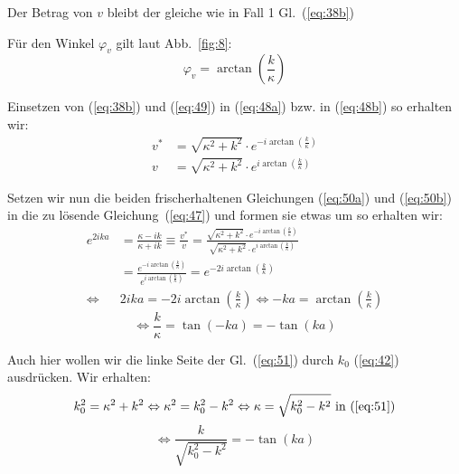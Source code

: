 Der Betrag von $v$ bleibt der gleiche wie in Fall 1 Gl.~(\ref{eq:38b})

Für den Winkel $\varphi_v$ gilt laut Abb.~\ref{fig:8}:
\begin{equation}
  \label{eq:49}
  \varphi_v=\arctan\left(\frac k \kappa \right)
\end{equation}

Einsetzen von (\ref{eq:38b}) und (\ref{eq:49}) in (\ref{eq:48a}) bzw. in
(\ref{eq:48b}) so erhalten wir:
\begin{subequations}
\begin{align}
  v^*&=\sqrt{\kappa^2+k^2}\cdot e^{-i\arctan\left(\frac k \kappa \right)}\label{eq:50a}\\
  v&=\sqrt{\kappa^2+k^2}\cdot e^{i\arctan\left(\frac k \kappa \right)}\label{eq:50b}
\end{align}
\end{subequations}

Setzen wir nun die beiden frischerhaltenen Gleichungen (\ref{eq:50a}) und
(\ref{eq:50b}) in die zu lösende Gleichung~(\ref{eq:47}) und formen sie etwas um
so erhalten wir:
\begin{align*}
  e^{2ika} &=\frac{\kappa-ik}{\kappa+ik} \equiv \frac {v^*} v
  =\frac
  {\sqrt{\kappa^2+k^2}\cdot e^{-i\arctan \left(\frac k \kappa \right)}}
  {\sqrt{\kappa^2+k^2}\cdot e^{i\arctan \left(\frac k \kappa \right)}}\\
  &=\frac
  {e^{-i \arctan \left(\frac k \kappa \right)}}
  {e^{i \arctan \left(\frac k \kappa \right)}}
   =e^{-2 i \arctan \left(\frac k \kappa \right)}\\
    \Leftrightarrow &
   2 i ka= -2 i \arctan \left(\frac k \kappa \right)
    \Leftrightarrow
   -ka=\arctan \left(\frac k \kappa \right)
\end{align*}
\begin{equation}
  \label{eq:51}
  \Leftrightarrow \frac k \kappa = \tan(-ka)= -\tan(ka)
\end{equation}

Auch hier wollen wir die linke Seite der Gl.~(\ref{eq:51}) durch $k_0$
(\ref{eq:42}) ausdrücken. Wir erhalten:
\begin{equation*}
   k_0^2=\kappa^2+k^2 \Leftrightarrow  \kappa^2=k_0^2-k^2
                      \Leftrightarrow  \kappa=\sqrt{k_0^2-k^2} \text{  in  }
                                        (\ref{eq:51})
\end{equation*}
\begin{equation}
  \label{eq:52}
  \Leftrightarrow \frac k {\sqrt{k_0^2-k^2}} = -\tan(ka)
\end{equation}

